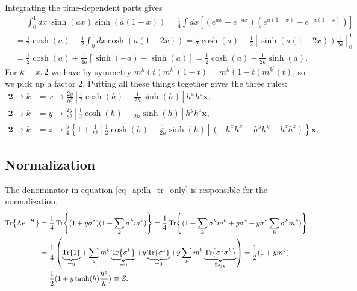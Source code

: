 Integrating the time-dependent parts gives
\begin{align*}
    &= \int_{0}^1 dx\: \sinh(ax)\sinh(a(1-x)) = \frac{1}{4} \int dx \left[(e^{ax} - e^{-ax})(e^{a(1-x)} - e^{-a(1-x)})\right]\\
    &= \frac{1}{2} \cosh(a) - \frac{1}{2}\int_0^1 dx \cosh(a(1-2x)) = \frac{1}{2} \cosh(a) + \frac{1}{2}[\sinh(a(1-2x))\frac{1}{2a}]_0^1\\
    & = \frac{1}{2} \cosh(a) + \frac{1}{4a}[\sinh(-a) - \sinh(a)] = \frac{1}{2} \cosh(a) - \frac{1}{2a}\sinh(a).
\end{align*}
For $k=x,2$ we have by symmetry $m^k(t) m^{k^\prime}(1-t) = m^k(1-t) m^{k^\prime}(t)$, so we pick up a factor 2. Putting all these things together gives the three rules:
\begin{align*}
    \textbf{2} \rightarrow k&=x\rightarrow \frac{2y}{h^y}\left[ \frac{1}{2}\cosh(h) - \frac{1}{2h}\sinh(h) \right]h^xh^z\mathbf{x},\\
    \textbf{2} \rightarrow k&=y\rightarrow \frac{2y}{h^y}\left[  \frac{1}{2}\cosh(h) - \frac{1}{2h}\sinh(h) \right]h^yh^z\mathbf{x},\\
     \textbf{2} \rightarrow k&=z\rightarrow \frac{y}{4}\left\{1 + \frac{1}{h^y}\left[  \frac{1}{2}\cosh(h) - \frac{1}{2h}\sinh(h) \right](-h^xh^x - h^yh^y + h^zh^z)\right\}\mathbf{x}.
\end{align*}

\subsection*{Normalization}

The denominator in equation \ref{eq_ap:lh_tr_only} is responsible for the normalization,
\begin{align*}
    \Tr{\Lambda e^{-H}} &= \frac{1}{4}\Tr{(1 + y\sigma^z) (1+ \sum_k \sigma^k m^k)} =\frac{1}{4}\Tr{(1 + \sum_k \sigma^k m^k + y\sigma^z + y\sigma^z \sum_k \sigma^k m^k)} \\
    &= \frac{1}{4}\left(\underbrace{\Tr{1}}_{=y} + \sum_k m^k\underbrace{\Tr{\sigma^k}}_{=0} + y\underbrace{\Tr{\sigma^z}}_{=0} + y \sum_k m^k \underbrace{\Tr{\sigma^z  \sigma^k}}_{2\delta_{zk}} \right) = \frac{1}{2}(1 + ym^z )\\
    & = \frac{1}{2}(1 + y \tanh(h)\frac{h^z}{h})\equiv Z.
\end{align*}

